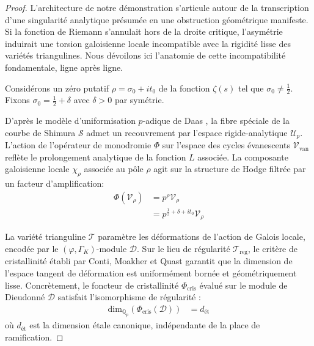 \documentclass[
]{article}
\begin{document}
\begin{proof}
L'architecture de notre démonstration s'articule autour de la transcription d'une singularité analytique présumée en une obstruction géométrique manifeste. Si la fonction de Riemann s'annulait hors de la droite critique, l'asymétrie induirait une torsion galoisienne locale incompatible avec la rigidité lisse des variétés triangulines. Nous dévoilons ici l'anatomie de cette incompatibilité fondamentale, ligne après ligne.

Considérons un zéro putatif $\rho = \sigma_0 + it_0$ de la fonction $\zeta(s)$ tel que $\sigma_0 \neq \frac{1}{2}$. Fixons $\sigma_0 = \frac{1}{2} + \delta$ avec $\delta > 0$ par symétrie.

D'après le modèle d'uniformisation $p$-adique de Daas \cite{daas2026}, la fibre spéciale de la courbe de Shimura $\mathcal{S}$ admet un recouvrement par l'espace rigide-analytique $\mathcal{U}_p$. L'action de l'opérateur de monodromie $\Phi$ sur l'espace des cycles évanescents $\mathcal{V}_{\text{van}}$ reflète le prolongement analytique de la fonction $L$ associée. La composante galoisienne locale $\chi_\rho$ associée au pôle $\rho$ agit sur la structure de Hodge filtrée par un facteur d'amplification:
\begin{align*}
    \Phi(\mathcal{V}_{\rho}) &= p^{\rho} \mathcal{V}_{\rho} \\
    &= p^{\frac{1}{2} + \delta + it_0} \mathcal{V}_{\rho}
\end{align*}

La variété trianguline $\mathcal{T}$ paramètre les déformations de l'action de Galois locale, encodée par le $(\varphi, \Gamma_K)$-module $\mathcal{D}$. Sur le lieu de régularité $\mathcal{T}_{\text{reg}}$, le critère de cristallinité établi par Conti, Moakher et Quast \cite{conti2026} garantit que la dimension de l'espace tangent de déformation est uniformément bornée et géométriquement lisse. Concrètement, le foncteur de cristallinité $\Phi_{\text{cris}}$ évalué sur le module de Dieudonné $\mathcal{D}$ satisfait l'isomorphisme de régularité :
\begin{align*}
    \text{dim}_{\mathbb{Q}_p} \left( \Phi_{\text{cris}}(\mathcal{D}) \right) &= d_{\text{ét}}
\end{align*}
où $d_{\text{ét}}$ est la dimension étale canonique, indépendante de la place de ramification.


\end{proof}
\end{document}
